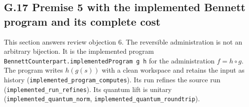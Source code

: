 \documentclass[
]{article}
\begin{document}
\subsection{G.17 Premise 5 with the implemented Bennett program and its
complete
cost}\label{g.17-premise-5-with-the-implemented-bennett-program-and-its-complete-cost}

This section answers review objection 6. The reversible administration
is not an arbitrary bijection. It is the implemented program
\texttt{B\allowbreak{}e\allowbreak{}n\allowbreak{}n\allowbreak{}e\allowbreak{}t\allowbreak{}t\allowbreak{}C\allowbreak{}o\allowbreak{}u\allowbreak{}n\allowbreak{}t\allowbreak{}e\allowbreak{}r\allowbreak{}p\allowbreak{}a\allowbreak{}r\allowbreak{}t\allowbreak{}.\allowbreak{}i\allowbreak{}m\allowbreak{}p\allowbreak{}l\allowbreak{}e\allowbreak{}m\allowbreak{}e\allowbreak{}n\allowbreak{}t\allowbreak{}e\allowbreak{}d\allowbreak{}P\allowbreak{}r\allowbreak{}o\allowbreak{}g\allowbreak{}r\allowbreak{}a\allowbreak{}m\allowbreak{} \allowbreak{}g\allowbreak{} \allowbreak{}h}
for the administration \(f=h\circ g\). The program writes \(h(g(s))\)
with a clean workspace and retains the input as history
(\texttt{i\allowbreak{}m\allowbreak{}p\allowbreak{}l\allowbreak{}e\allowbreak{}m\allowbreak{}e\allowbreak{}n\allowbreak{}t\allowbreak{}e\allowbreak{}d\allowbreak{}\_\allowbreak{}p\allowbreak{}r\allowbreak{}o\allowbreak{}g\allowbreak{}r\allowbreak{}a\allowbreak{}m\allowbreak{}\_\allowbreak{}c\allowbreak{}o\allowbreak{}m\allowbreak{}p\allowbreak{}u\allowbreak{}t\allowbreak{}e\allowbreak{}s}).
Its run refines the source run
(\texttt{i\allowbreak{}m\allowbreak{}p\allowbreak{}l\allowbreak{}e\allowbreak{}m\allowbreak{}e\allowbreak{}n\allowbreak{}t\allowbreak{}e\allowbreak{}d\allowbreak{}\_\allowbreak{}r\allowbreak{}u\allowbreak{}n\allowbreak{}\_\allowbreak{}r\allowbreak{}e\allowbreak{}f\allowbreak{}i\allowbreak{}n\allowbreak{}e\allowbreak{}s}).
Its quantum lift is unitary
(\texttt{i\allowbreak{}m\allowbreak{}p\allowbreak{}l\allowbreak{}e\allowbreak{}m\allowbreak{}e\allowbreak{}n\allowbreak{}t\allowbreak{}e\allowbreak{}d\allowbreak{}\_\allowbreak{}q\allowbreak{}u\allowbreak{}a\allowbreak{}n\allowbreak{}t\allowbreak{}u\allowbreak{}m\allowbreak{}\_\allowbreak{}n\allowbreak{}o\allowbreak{}r\allowbreak{}m},
\texttt{i\allowbreak{}m\allowbreak{}p\allowbreak{}l\allowbreak{}e\allowbreak{}m\allowbreak{}e\allowbreak{}n\allowbreak{}t\allowbreak{}e\allowbreak{}d\allowbreak{}\_\allowbreak{}q\allowbreak{}u\allowbreak{}a\allowbreak{}n\allowbreak{}t\allowbreak{}u\allowbreak{}m\allowbreak{}\_\allowbreak{}r\allowbreak{}o\allowbreak{}u\allowbreak{}n\allowbreak{}d\allowbreak{}t\allowbreak{}r\allowbreak{}i\allowbreak{}p}).
\end{document}
